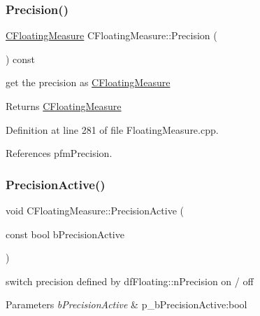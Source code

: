\mbox{\label{classCFloatingMeasure_ac8975daf37b98b3e996893e0de43c4eb}} 
\subsubsection{\texorpdfstring{Precision()}{Precision()}\hspace{0.1cm}{\footnotesize\ttfamily [2/2]}}
{\footnotesize\ttfamily \hyperlink{classCFloatingMeasure}{C\+Floating\+Measure} C\+Floating\+Measure\+::\+Precision (\begin{DoxyParamCaption}{ }\end{DoxyParamCaption}) const}



get the precision as \hyperlink{classCFloatingMeasure}{C\+Floating\+Measure} 

\begin{DoxyReturn}{Returns}
\hyperlink{classCFloatingMeasure}{C\+Floating\+Measure} 
\end{DoxyReturn}


Definition at line 281 of file Floating\+Measure.\+cpp.



References pfm\+Precision.

\mbox{\label{classCFloatingMeasure_a4fe4d60589da6d4c7f09cb09fbea730b}} 
\subsubsection{\texorpdfstring{Precision\+Active()}{PrecisionActive()}}
{\footnotesize\ttfamily void C\+Floating\+Measure\+::\+Precision\+Active (\begin{DoxyParamCaption}\item[{const bool}]{b\+Precision\+Active }\end{DoxyParamCaption})\hspace{0.3cm}{\ttfamily [inline]}}



switch precision defined by df\+Floating\+::n\+Precision on / off 


\begin{DoxyParams}{Parameters}
{\em b\+Precision\+Active} & p\+\_\+b\+Precision\+Active\+:bool \\
\hline
\end{DoxyParams}


